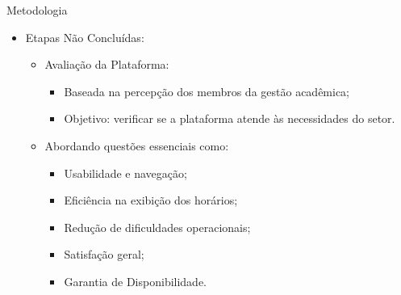 \begin{frame}{Metodologia}
    \begin{itemize}
        \item Etapas Não Concluídas: \vspace{0.25cm}
              \begin{itemize}
                  \item Avaliação da Plataforma: \vspace{0.2cm}
                        \begin{itemize}
                            \item Baseada na percepção dos membros da gestão acadêmica; \vspace{0.2cm}
                            \item Objetivo: verificar se a plataforma atende às necessidades do setor. \vspace{0.2cm}
                        \end{itemize}
                  \item Abordando questões essenciais como: \vspace{0.2cm}
                        \begin{itemize}
                            \item Usabilidade e navegação; \vspace{0.2cm}
                            \item Eficiência na exibição dos horários; \vspace{0.2cm}
                            \item Redução de dificuldades operacionais; \vspace{0.2cm}
                            \item Satisfação geral; \vspace{0.2cm}
                            \item Garantia de Disponibilidade. \vspace{0.2cm}
                        \end{itemize}
              \end{itemize}
    \end{itemize}
\end{frame}

